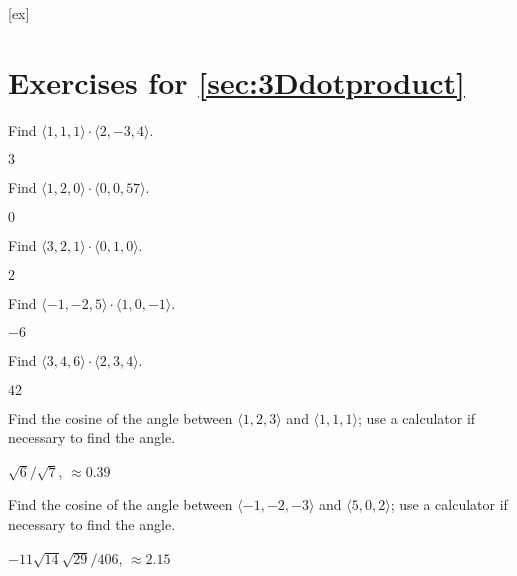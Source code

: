 [ex]
\section*{Exercises for \ref{sec:3Ddotproduct}}

\begin{enumialphparenastyle}

\begin{ex}
Find $\langle 1,1,1\rangle\cdot\langle 2,-3,4\rangle$.
\begin{sol}
	$3$
\end{sol}
\end{ex}

\begin{ex}
Find $\langle 1,2,0\rangle\cdot\langle 0,0,57\rangle$.
\begin{sol}
	$0$
\end{sol}
\end{ex}

\begin{ex}
Find $\langle 3,2,1\rangle\cdot\langle 0,1,0\rangle$.
\begin{sol}
	$2$
\end{sol}
\end{ex}

\begin{ex}
Find $\langle -1,-2,5\rangle\cdot\langle 1,0,-1 \rangle$.
\begin{sol}
	$-6$
\end{sol}
\end{ex}

\begin{ex}
Find $\langle 3,4,6\rangle\cdot\langle 2,3,4\rangle$.
\begin{sol}
	$42$
\end{sol}
\end{ex}

\begin{ex}
Find the cosine of the angle between $\langle 1,2,3\rangle$
and $\langle 1,1,1\rangle$; use a calculator if necessary to find the angle.
\begin{sol}
	$\sqrt6/\sqrt7$, $\approx 0.39$
\end{sol}
\end{ex}

\begin{ex}
Find the cosine of the angle between $\langle -1, -2,-3\rangle$
and $\langle 5,0,2\rangle$; use a calculator if necessary to find the angle.
\begin{sol}
	$-11\sqrt{14}\sqrt{29}/406$, $\approx 2.15$
\end{sol}
\end{ex}


\end{enumialphparenastyle}

